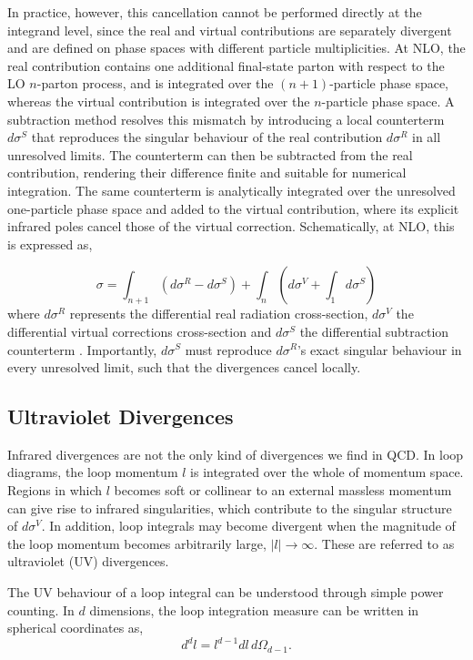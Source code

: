 In practice, however, this cancellation cannot be performed directly at the integrand
level, since the real and virtual contributions are separately divergent and are
defined on phase spaces with different particle multiplicities. At NLO, the real
contribution contains one additional final-state parton with respect to the LO
$n$-parton process, and is integrated over the
$(n+1)$-particle phase space, whereas the virtual contribution is integrated over the
$n$-particle phase space. A subtraction method resolves this mismatch by introducing
a local counterterm $d\sigma^S$ that reproduces the singular behaviour of the real
contribution $d\sigma^R$ in all unresolved limits. The counterterm can then be
subtracted from the real contribution, rendering their difference finite and suitable
for numerical integration. The same counterterm is analytically integrated over the
unresolved one-particle phase space and added to the virtual contribution, where its
explicit infrared poles cancel those of the virtual correction. Schematically, at NLO,
this is expressed as,

\begin{equation}\label{eq:subScheme}
    \sigma=\int_{n+1}\left(d\sigma^R-d\sigma^S\right)+\int_n\left(d\sigma^V+\int_1d\sigma^S\right)
\end{equation}
where $d\sigma^R$ represents the differential real radiation cross-section,
$d\sigma^V$ the differential virtual corrections cross-section and $d\sigma^S$
the differential subtraction counterterm \cite{Catani:1996vz}.
Importantly, $d\sigma^S$ must reproduce $d\sigma^R$'s exact singular behaviour
in every unresolved limit, such that the divergences cancel locally.

\subsection{Ultraviolet Divergences}\label{subsec:uvDivergences}

Infrared divergences are not the only kind of divergences we find in QCD. In loop
diagrams, the loop momentum $l$ is integrated over the whole of momentum space.
Regions in which $l$ becomes soft or collinear to an external massless momentum can
give rise to infrared singularities, which contribute to the singular structure of
$d\sigma^V$. In addition, loop integrals may become divergent when the magnitude of
the loop momentum becomes arbitrarily large, $|l|\to\infty$. These are referred to as
ultraviolet (UV) divergences.

The UV behaviour of a loop integral can be understood through simple power counting.
In $d$ dimensions, the loop integration measure can be written in spherical
coordinates as,
\begin{equation}
    d^dl=l^{d-1}dl\,d\Omega_{d-1}.
\end{equation}

